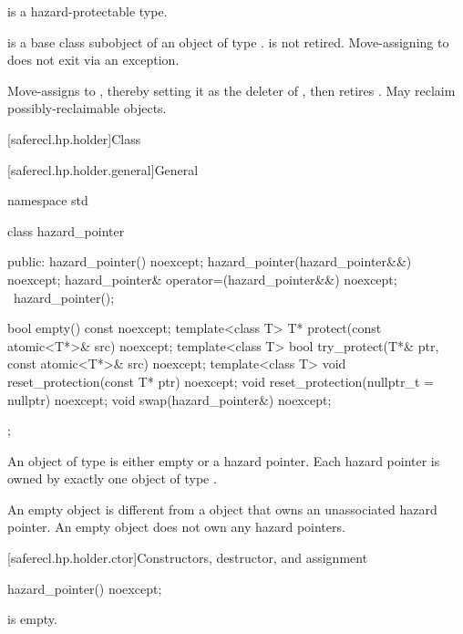 \begin{itemdescr}
\pnum
\mandates
{} is a hazard-protectable type.

\pnum
\expects
{} is
a base class subobject of an object  of type .
 is not retired.
Move-assigning  to  does not exit via an exception.

\pnum
\effects
Move-assigns  to ,
thereby setting it as the deleter of ,
then retires .
May reclaim possibly-reclaimable objects.
\end{itemdescr}

[saferecl.hp.holder]{Class }

[saferecl.hp.holder.general]{General}

\begin{codeblock}
namespace std {
  class hazard_pointer {
  public:
    hazard_pointer() noexcept;
    hazard_pointer(hazard_pointer&&) noexcept;
    hazard_pointer& operator=(hazard_pointer&&) noexcept;
    ~hazard_pointer();

    bool empty() const noexcept;
    template<class T> T* protect(const atomic<T*>& src) noexcept;
    template<class T> bool try_protect(T*& ptr, const atomic<T*>& src) noexcept;
    template<class T> void reset_protection(const T* ptr) noexcept;
    void reset_protection(nullptr_t = nullptr) noexcept;
    void swap(hazard_pointer&) noexcept;
  };
}
\end{codeblock}

\pnum
An object of type  is either empty or
 a hazard pointer.
Each hazard pointer is owned by
exactly one object of type .
\begin{note}
An empty  object is different from
a  object
that owns an unassociated hazard pointer.
An empty  object does not own any hazard pointers.
\end{note}

[saferecl.hp.holder.ctor]{Constructors, destructor, and assignment}

%
\begin{itemdecl}
hazard_pointer() noexcept;
\end{itemdecl}

\begin{itemdescr}
\pnum
\ensures
{} is empty.
\end{itemdescr}


